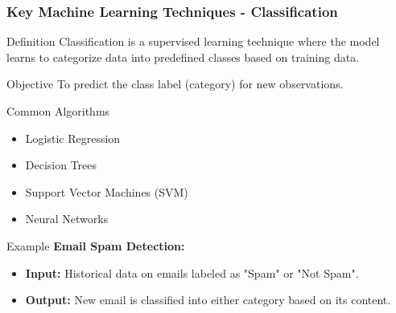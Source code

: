 \documentclass[aspectratio=169]{beamer}
\begin{document}
\begin{frame}[fragile]
  \frametitle{Key Machine Learning Techniques - Classification}
  \begin{block}{Definition}
    Classification is a supervised learning technique where the model learns to categorize data into predefined classes based on training data.
  \end{block}
  
  \begin{block}{Objective}
    To predict the class label (category) for new observations.
  \end{block}
  
  \begin{block}{Common Algorithms}
    \begin{itemize}
      \item Logistic Regression
      \item Decision Trees
      \item Support Vector Machines (SVM)
      \item Neural Networks
    \end{itemize}
  \end{block}
  
  \begin{block}{Example}
    \textbf{Email Spam Detection:}
    \begin{itemize}
      \item \textbf{Input:} Historical data on emails labeled as "Spam" or "Not Spam".
      \item \textbf{Output:} New email is classified into either category based on its content.
    \end{itemize}
  \end{block}
\end{frame}
\end{document}
